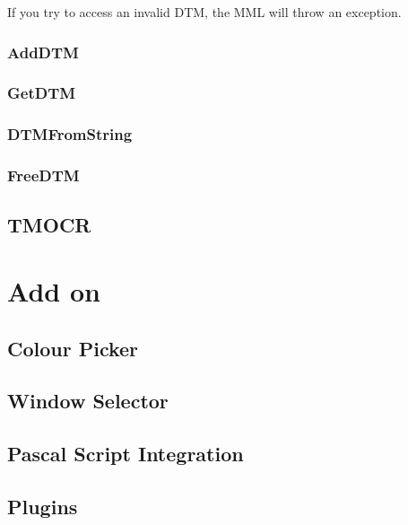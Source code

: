 \documentclass[a4paper]{report}
\begin{document}
If you try to access an invalid DTM, the MML will throw an exception.


\subsection{AddDTM}
\subsection{GetDTM}
\subsection{DTMFromString}
\subsection{FreeDTM}

\section{TMOCR}

\chapter{Add on}

\section{Colour Picker}

\section{Window Selector}

\section{Pascal Script Integration}

\section{Plugins}
\end{document}
